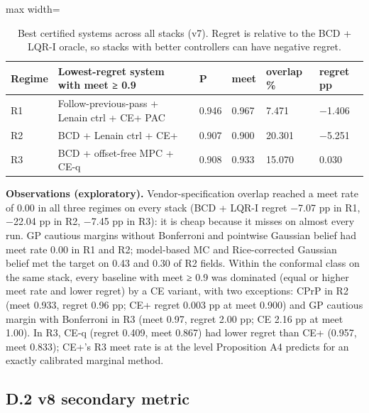 \documentclass[preprint,12pt,authoryear]{elsarticle}
\begin{document}
\begin{table}[!htbp]
\centering
\footnotesize
\renewcommand{\thetable}{S4}\caption{Best certified systems across all stacks (v7). Regret is relative to the BCD + LQR-I oracle, so stacks with better controllers can have negative regret.}
\begin{adjustbox}{max width=\textwidth}
\begin{tabular}{@{}l>{\raggedright\arraybackslash}p{20.8em}llll@{}}
\toprule
\textbf{Regime} & \textbf{Lowest-regret system with meet ≥ 0.9} & \textbf{P} & \textbf{meet} & \textbf{overlap \%} & \textbf{regret pp} \\
\midrule
R1 & Follow-previous-pass + Lenain ctrl + CE+ PAC & 0.946 & 0.967 & 7.471 & −1.406 \\
R2 & BCD + Lenain ctrl + CE+ & 0.907 & 0.900 & 20.301 & −5.251 \\
R3 & BCD + offset-free MPC + CE-q & 0.908 & 0.933 & 15.070 & 0.030 \\
\bottomrule
\end{tabular}
\end{adjustbox}
\end{table}

\textbf{Observations (exploratory).} Vendor-specification overlap reached a meet rate of 0.00 in all three regimes on every stack (BCD + LQR-I regret −7.07 pp in R1, −22.04 pp in R2, −7.45 pp in R3): it is cheap because it misses on almost every run. GP cautious margins without Bonferroni and pointwise Gaussian belief had meet rate 0.00 in R1 and R2; model-based MC and Rice-corrected Gaussian belief met the target on 0.43 and 0.30 of R2 fields. Within the conformal class on the same stack, every baseline with meet ≥ 0.9 was dominated (equal or higher meet rate and lower regret) by a CE variant, with two exceptions: CPrP in R2 (meet 0.933, regret 0.96 pp; CE+ regret 0.003 pp at meet 0.900) and GP cautious margin with Bonferroni in R3 (meet 0.97, regret 2.00 pp; CE 2.16 pp at meet 1.00). In R3, CE-q (regret 0.409, meet 0.867) had lower regret than CE+ (0.957, meet 0.833); CE+'s R3 meet rate is at the level Proposition A4 predicts for an exactly calibrated marginal method.

\subsection*{D.2 v8 secondary metric}
\end{document}
